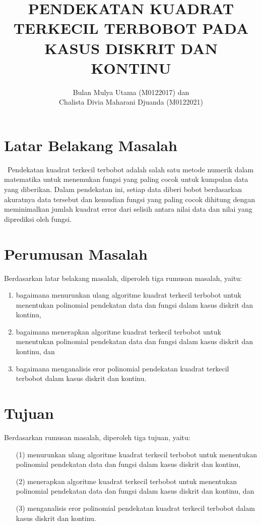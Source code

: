 \documentclass[a4paper,12pt]{article}
\title{PENDEKATAN KUADRAT TERKECIL TERBOBOT PADA KASUS DISKRIT DAN KONTINU}
\author{Bulan Mulya Utama (M0122017) dan\\ Chalista Divia Maharani Djuanda (M0122021)}
\begin{document}
	
\maketitle
	
	
	
\section{Latar Belakang Masalah}
	\ \indent Pendekatan kuadrat terkecil terbobot adalah salah satu metode numerik dalam matematika untuk menemukan fungsi yang paling cocok untuk kumpulan data yang diberikan. Dalam pendekatan ini, setiap data diberi bobot berdasarkan akuratnya data tersebut dan kemudian fungsi yang paling cocok dihitung dengan meminimalkan jumlah kuadrat error dari selisih antara nilai data dan nilai yang diprediksi oleh fungsi.
	\section{Perumusan Masalah}
	Berdasarkan latar belakang masalah, diperoleh tiga rumusan masalah, yaitu:
\begin{enumerate}
	\item bagaimana menurunkan ulang algoritme kuadrat terkecil terbobot untuk menentukan polinomial pendekatan data dan fungsi dalam kasus diskrit dan kontinu,
	\item bagaimana menerapkan algoritme kuadrat terkecil terbobot untuk menentukan polinomial pendekatan data dan fungsi dalam kasus diskrit dan kontinu, dan
	\item bagaimana menganalisis eror polinomial pendekatan kuadrat terkecil terbobot dalam kasus diskrit dan kontinu.
\end{enumerate}
\section{Tujuan}
Berdasarkan rumusan masalah, diperoleh tiga tujuan, yaitu:
\begin{enumerate}
	\item [(1)] menurunkan ulang algoritme kuadrat terkecil terbobot untuk menentukan polinomial pendekatan data dan fungsi dalam kasus diskrit dan kontinu,
	\item [(2)] menerapkan algoritme kuadrat terkecil terbobot untuk menentukan polinomial pendekatan data dan fungsi dalam kasus diskrit dan kontinu, dan
	\item [(3)] menganalisis eror polinomial pendekatan kuadrat terkecil terbobot dalam kasus diskrit dan kontinu.
\end{enumerate}
\end{document}
